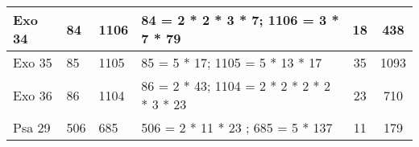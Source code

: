 \begin{center}
\begin{longtable}{|p{0.45in}|p{0.25in}|p{0.4in}|p{2.8in}|c|c|}
\endfoot 
Exo 34 & 84 & 1106 & 84 = 2 * 2 * 3 * 7; 1106 = 3 * 7 * 79 & 18 & 438 \\ \hline
Exo 35 & 85 & 1105 & 85 = 5 * 17; 1105 = 5 * 13 * 17 & 35 & 1093 \\ \hline
Exo 36 & 86 & 1104 & 86 = 2 * 43; 1104 = 2 * 2 * 2 * 2 * 3 * 23 & 23 & 710 \\ \hline \hline

Psa 29 & 506 & 685 &  506 = 2 * 11 * 23 ; 685 = 5 * 137 & 11 & 179 \\ \hline \hline


\end{longtable}
\end{center}
